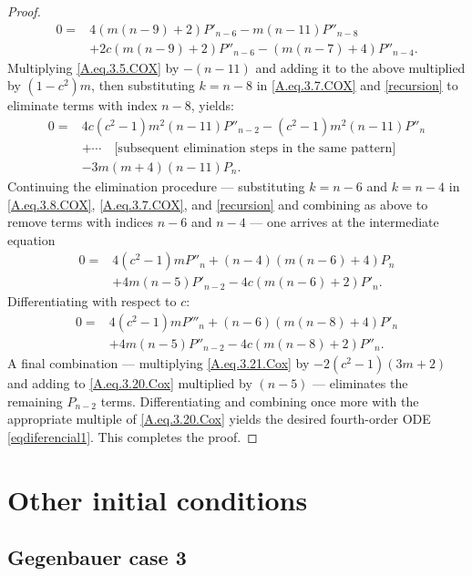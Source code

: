 \documentclass[final,nopreprintline]{elsarticle}
\theoremstyle{definition}
\numberwithin{equation}{section}
\theoremstyle{remark}
\begin{document}
\begin{proof}
\begin{align}
    0=&4 (m (n-9)+2) P'_{n-6} -m (n-11) P''_{n-8} \nonumber\\
    &+2 c (m (n-9)+2) P''_{n-6} -(m (n-7)+4) P''_{n-4}.
\end{align}
Multiplying \eqref{A.eq.3.5.COX} by $-(n-11)$ and adding it to the above multiplied by
$(1-c^2)m$, then substituting $k=n-8$ in \eqref{A.eq.3.7.COX} and \eqref{recursion}
to eliminate terms with index $n-8$, yields:
\begin{align}
    0=&4 c \left(c^2-1\right) m^2 (n-11) P''_{n-2} -\left(c^2-1\right) m^2 (n-11) P''_n \nonumber\\
    &+\cdots\quad\text{[subsequent elimination steps in the same pattern]}\nonumber\\
    &-3 m (m+4) (n-11) P_n. \label{A.eq.3.14.Cox}
\end{align}
Continuing the elimination procedure — substituting $k=n-6$ and $k=n-4$ in
\eqref{A.eq.3.8.COX}, \eqref{A.eq.3.7.COX}, and \eqref{recursion} and
combining as above to remove terms with indices $n-6$ and $n-4$ — one arrives at the
intermediate equation
\begin{align}
    0=&4 \left(c^2-1\right) m P''_n +(n-4) (m (n-6)+4) P_n \nonumber\\
    &+4 m (n-5) P'_{n-2} -4 c (m (n-6)+2)  P'_n. \label{A.eq.3.20.Cox}
\end{align}
Differentiating with respect to $c$:
\begin{align}
    0=&4 \left(c^2-1\right) m P'''_n +(n-6) (m (n-8)+4)  P'_n \nonumber\\
    &+4 m (n-5) P''_{n-2} -4 c (m (n-8)+2) P''_n. \label{A.eq.3.21.Cox}
\end{align}
A final combination — multiplying \eqref{A.eq.3.21.Cox} by $-2(c^2-1)(3m+2)$ and adding
to \eqref{A.eq.3.20.Cox} multiplied by $(n-5)$ — eliminates the remaining $P_{n-2}$ terms.
Differentiating and combining once more with the appropriate multiple of \eqref{A.eq.3.20.Cox}
yields the desired fourth-order ODE \eqref{eqdiferencial1}. This completes the proof.
\end{proof}

\section{Other initial conditions}\label{app:other-initial}

\subsection{Gegenbauer case 3}
\end{document}
